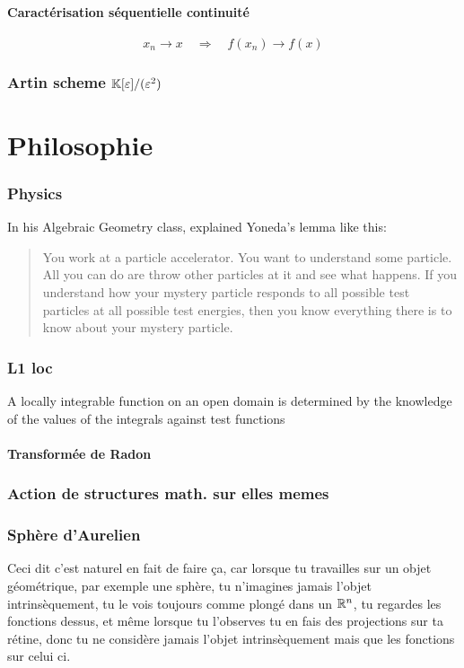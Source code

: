\documentclass[12pt,makeidx, draft]{amsart}
\begin{document}
\subsection{Caractérisation séquentielle continuité}
\[
x_n \to x
\quad \Rightarrow\quad
f(x_n) \to f(x)
\]
\section{Artin scheme $\mathbb{K}[\varepsilon]/(\varepsilon^2)$}

\part{Philosophie}

\section{Physics}
In his Algebraic Geometry class,  explained Yoneda's lemma like this: 
\begin{quote}
You work at a particle accelerator. You want to understand some particle. All you can do are throw other particles at it and see what happens. If you understand how your mystery particle responds to all possible test particles at all possible test energies, then you know everything there is to know about your mystery particle.
\end{quote}

\section{L1 loc}



A locally integrable function on an open domain is determined by the knowledge of the values of the integrals against test functions


\subsection{Transformée de Radon}

\section{Action de structures math. sur elles memes}

\section{Sphère d'Aurelien}
Ceci dit c'est naturel en fait de faire ça, car lorsque tu travailles sur un objet géométrique, par exemple une sphère, tu n'imagines jamais l'objet intrinsèquement, tu le vois toujours comme plongé dans un $\mathbb{R}^n$, tu regardes les fonctions dessus, et même lorsque tu l'observes tu en fais des projections sur ta rétine, donc tu ne considère jamais l'objet intrinsèquement mais que les fonctions sur celui ci.
\end{document}
